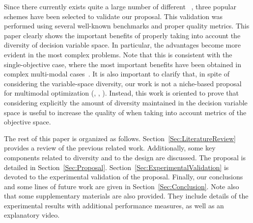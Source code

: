 Since there currently exists quite a large number of different \MOEAS{}~\citep{Joel:MOEA_APPLICATIONS_BOOK_KCTAN}, 
three popular schemes have been selected to validate our proposal.
%
This validation was performed using several well-known benchmarks and proper quality metrics.
%
This paper clearly shows the important benefits of properly taking into account the diversity of decision variable space.
%
In particular, the advantages become more evident in the most complex problems.
%
Note that this is consistent with the single-objective case, where the most important benefits have been obtained
in complex multi-modal cases~\citep{Segura:17}.
%
It is also important to clarify that, in spite of considering the variable-space diversity, our work is not a niche-based proposal
for multimodal optimization (\cite{liang2016multimodal}, \cite{deb2005omni}, \cite{li2016seeking}).
%
Instead, this work is oriented to prove that considering explicitly the amount of diversity maintained in the decision variable space 
is useful to increase the quality of \MOEAS{} when taking into account metrics of the objective space.

The rest of this paper is organized as follows. 
%
Section~\ref{Sec:LiteratureReview} provides a review of the previous related work.
%
Additionally, some key components related to diversity and to the \VSDMOEA{} design are discussed.
%
The \VSDMOEA{} proposal is detailed in Section~\ref{Sec:Proposal}.
%
Section~\ref{Sec:ExperimentalValidation} is devoted to the experimental validation of the proposal.
%
Finally, our conclusions and some lines of future work are given in Section~\ref{Sec:Conclusion}.
%
Note also that some supplementary materials are also provided.
%
They include details of the experimental results with additional performance measures, 
as well as an explanatory video.
